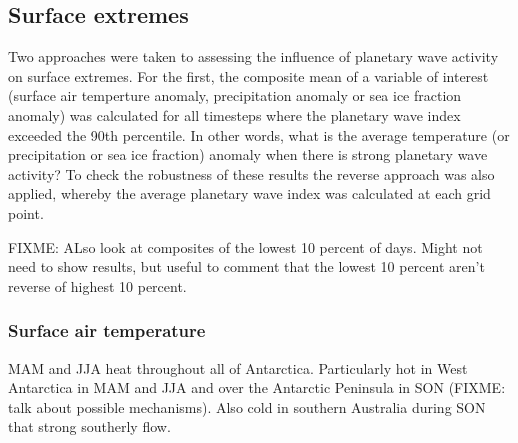 \subsection{Surface extremes}

Two approaches were taken to assessing the influence of planetary wave activity on surface extremes. For the first, the composite mean of a variable of interest (surface air temperture anomaly, precipitation anomaly or sea ice fraction anomaly) was calculated for all timesteps where the planetary wave index exceeded the 90th percentile. In other words, what is the average temperature (or precipitation or sea ice fraction) anomaly when there is strong planetary wave activity? To check the robustness of these results the reverse approach was also applied, whereby the average planetary wave index was calculated at each grid point.

FIXME: ALso look at composites of the lowest 10 percent of days. Might not need to show results, but useful to comment that the lowest 10 percent aren't reverse of highest 10 percent.

\subsubsection{Surface air temperature}

MAM and JJA heat throughout all of Antarctica. Particularly hot in West Antarctica in MAM and JJA and over the Antarctic Peninsula in SON (FIXME: talk about possible mechanisms). Also cold in southern Australia during SON that strong southerly flow.


